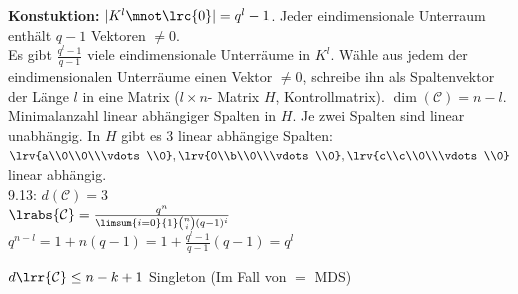 		\textbf{Konstuktion:} $ |K^l\mnot\lrc{0}|=q^l-1 $. Jeder eindimensionale Unterraum enthält $ q-1 $ Vektoren $ \neq 0 $.\\
		Es gibt $ \frac{q^l-1}{q-1} $ viele eindimensionale Unterräume in $ K^l $. Wähle aus jedem der eindimensionalen Unterräume einen Vektor $ \neq 0 $, schreibe ihn als Spaltenvektor der Länge $ l $ in eine Matrix ($ l\times n $- Matrix $ H $, Kontrollmatrix). $ \dim(\mathcal{C})=n-l $.\\
		Minimalanzahl linear abhängiger Spalten in $ H $. Je zwei Spalten sind linear unabhängig. In $ H $ gibt es 3 linear abhängige Spalten:\\
		$ \lrv{a\\0\\0\\\vdots\\0},\lrv{0\\b\\0\\\vdots\\0},\lrv{c\\c\\0\\\vdots\\0} $ linear abhängig.\\
		9.13: $ d(\mathcal{C})=3 $\\
		$ \lrabs{\mathcal{C}}=\frac{q^n}{\limsum{i=0}{1}\binom{n}{i}(q-1)^i} $\\
		$ q^{n-l}=1+n(q-1)=1+\frac{q^l-1}{q-1}(q-1)=q^l $
		
		$d\lrr{\mathcal{C}}\leq n-k+1$ Singleton (Im Fall von $=$ MDS)
	
